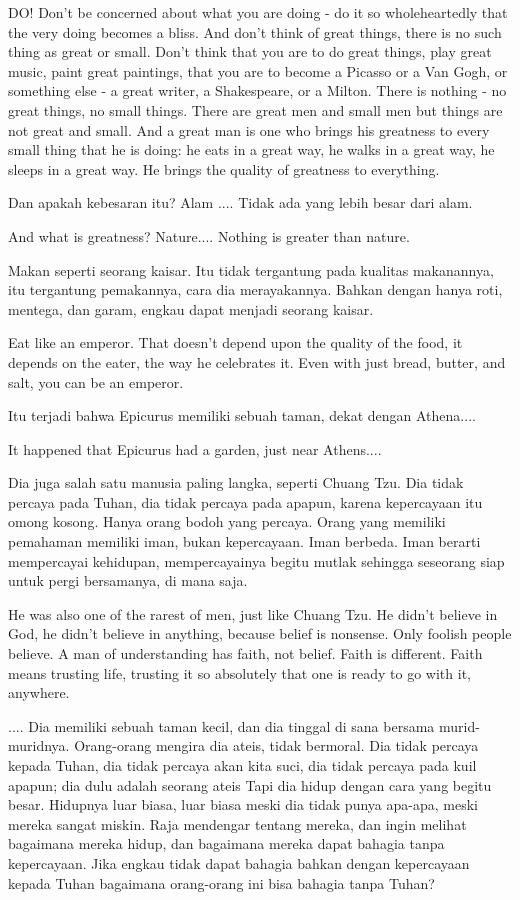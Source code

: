 \english
DO! Don't be concerned about what you are doing - do it so wholeheartedly that the very doing becomes a bliss. And don't think of great things, there is no such thing as great or small. Don't think that you are to do great things, play great music, paint great paintings, that you are to become a Picasso or a Van Gogh, or something else - a great writer, a Shakespeare, or a Milton. There is nothing - no great things, no small things. There are great men and small men but things are not great and small. And a great man is one who brings his greatness to every small thing that he is doing: he eats in a great way, he walks in a great way, he sleeps in a great way. He brings the quality of greatness to everything.

\bahasa
Dan apakah kebesaran itu? Alam .... Tidak ada yang lebih besar dari alam.

\english
And what is greatness? Nature.... Nothing is greater than nature.

\bahasa
Makan seperti seorang kaisar. Itu tidak tergantung pada kualitas makanannya, itu tergantung pemakannya, cara dia merayakannya. Bahkan dengan hanya roti, mentega, dan garam, engkau dapat menjadi seorang kaisar.

\english
Eat like an emperor. That doesn't depend upon the quality of the food, it depends on the eater, the way he celebrates it. Even with just bread, butter, and salt, you can be an emperor.

\bahasa
Itu terjadi bahwa Epicurus memiliki sebuah taman, dekat dengan Athena....

\english
It happened that Epicurus had a garden, just near Athens....

\bahasa
Dia juga salah satu manusia paling langka, seperti Chuang Tzu. Dia tidak percaya pada Tuhan, dia tidak percaya pada apapun, karena kepercayaan itu omong kosong. Hanya orang bodoh yang percaya. Orang yang memiliki pemahaman memiliki iman, bukan kepercayaan. Iman berbeda. Iman berarti mempercayai kehidupan, mempercayainya begitu mutlak sehingga seseorang siap untuk pergi bersamanya, di mana saja.

\english
He was also one of the rarest of men, just like Chuang Tzu. He didn't believe in God, he didn't believe in anything, because belief is nonsense. Only foolish people believe. A man of understanding has faith, not belief. Faith is different. Faith means trusting life, trusting it so absolutely that one is ready to go with it, anywhere.

\bahasa
.... Dia memiliki sebuah taman kecil, dan dia tinggal di sana bersama murid-muridnya. Orang-orang mengira dia ateis, tidak bermoral. Dia tidak percaya kepada Tuhan, dia tidak percaya akan kita suci, dia tidak percaya pada kuil apapun; dia dulu adalah seorang ateis Tapi dia hidup dengan cara yang begitu besar. Hidupnya luar biasa, luar biasa meski dia tidak punya apa-apa, meski mereka sangat miskin. Raja mendengar tentang mereka, dan ingin melihat bagaimana mereka hidup, dan bagaimana mereka dapat bahagia tanpa kepercayaan. Jika engkau tidak dapat bahagia bahkan dengan kepercayaan kepada Tuhan bagaimana orang-orang ini bisa bahagia tanpa Tuhan?

